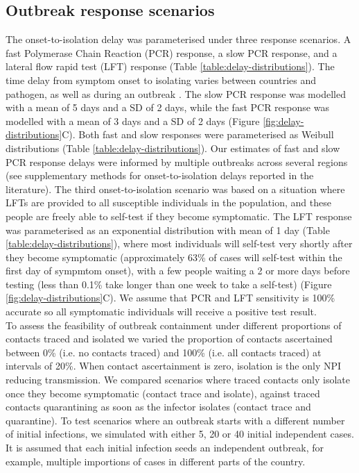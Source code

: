 \documentclass{article}
\begin{document}
\clearpage

\subsection*{Outbreak response scenarios}

The onset-to-isolation delay was parameterised under three response scenarios. A fast Polymerase Chain Reaction (PCR) response, a slow PCR response, and a lateral flow rapid test (LFT) response (Table \ref{table:delay-distributions}). The time delay from symptom onset to isolating varies between countries and pathogen, as well as during an outbreak \citep{donnellyEpidemiologicalDeterminantsSpread2003a, aliSerialIntervalsCase2022}. The slow PCR response was modelled with a mean of 5 days and a SD of 2 days, while the fast PCR response was modelled with a mean of 3 days and a SD of 2 days (Figure \ref{fig:delay-distributions}C). Both fast and slow responses were parameterised as Weibull distributions (Table \ref{table:delay-distributions}). Our estimates of fast and slow PCR response delays were informed by multiple outbreaks across several regions (see supplementary methods for onset-to-isolation delays reported in the literature). The third onset-to-isolation scenario was based on a situation where LFTs are provided to all susceptible individuals in the population, and these people are freely able to self-test if they become symptomatic. The LFT response was parameterised as an exponential distribution with mean of 1 day (Table \ref{table:delay-distributions}), where most individuals will self-test very shortly after they become symptomatic (approximately 63\% of cases will self-test within the first day of sympmtom onset), with a few people waiting a 2 or more days before testing (less than 0.1\% take longer than one week to take a self-test) (Figure \ref{fig:delay-distributions}C). We assume that PCR and LFT sensitivity is 100\% accurate so all symptomatic individuals will receive a positive test result. \\

To assess the feasibility of outbreak containment under different proportions of contacts traced and isolated we varied the proportion of contacts ascertained between 0\% (i.e. no contacts traced) and 100\% (i.e. all contacts traced) at intervals of 20\%. When contact ascertainment is zero, isolation is the only NPI reducing transmission. We compared scenarios where traced contacts only isolate once they become symptomatic (contact trace and isolate), against traced contacts quarantining as soon as the infector isolates (contact trace and quarantine). To test scenarios where an outbreak starts with a different number of initial infections, we simulated with either 5, 20 or 40 initial independent cases. It is assumed that each initial infection seeds an independent outbreak, for example, multiple importions of cases in different parts of the country.
\end{document}

